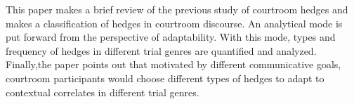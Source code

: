 \documentclass{standalone}
\begin{document}
\begin{englishabstract}

 This paper makes a brief review of the previous study of courtroom hedges and makes a classification of hedges in courtroom discourse. An analytical mode is put forward from the perspective of adaptability. With this mode, types and frequency of hedges in different trial genres are quantified and analyzed. Finally,the paper points out that motivated by different communicative goals, courtroom participants would choose different types of hedges to adapt to contextual correlates in different trial genres.   




\end{englishabstract}
\end{document}

